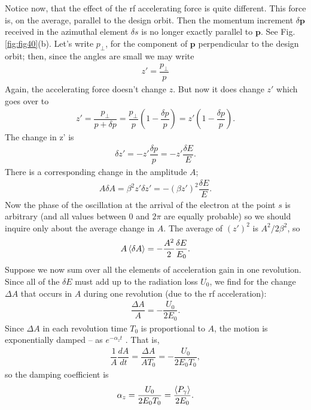 Notice now, that the effect of the rf accelerating force is quite different. This force is, on the average, parallel to the design orbit. Then the momentum increment $\delta\bm{p}$ received in the azimuthal element $\delta s$ is no longer exactly parallel to $\bm{p}$. See Fig. \ref{fig:fig40}(b). Let's write $p_\perp$, for the component of $\bm{p}$ perpendicular to the design orbit; then, since the angles are small we may write
\begin{align}
	z' = \dfrac{p_\perp}{p}
\end{align}
Again, the accelerating force doesn't change $z$. But now it does change $z'$ which goes over to
\begin{align}
	z' = \dfrac{p_\perp}{p + \delta p} = \dfrac{p_\perp}{p} \left( 1 - \dfrac{\delta p}{p} \right) = z' \left( 1 - \dfrac{\delta p}{p} \right).
\end{align}
The change in z’ is
\begin{align}
	\delta z' = -z' \dfrac{\delta p}{p} = -z' \dfrac{\delta E}{E}.
\end{align}
There is a corresponding change in the amplitude $A$;
\begin{align}
	A \delta A = \beta^2 z' \delta z' = -(\beta z')^2 \dfrac{\delta E}{E}.
\end{align}
Now the phase of the oscillation at the arrival of the electron at the point $s$ is arbitrary
 (and all values between $0$ and $2\pi$ are equally probable) so we should inquire only about the average change in $A$. The average of $(z')^2$ is $A^2/2\beta^2$, so
\begin{align}
	A \left< \delta A \right> = - \dfrac{A^2}{2} \dfrac{\delta E}{E_0}.
\end{align}
Suppose we now sum over all the elements of acceleration gain in one revolution. Since all of the $\delta E$ must add up to the radiation loss $U_0$, we find for the change $\Delta A$ that occurs in $A$ during one revolution (due to the rf acceleration):
\begin{align}
	\dfrac{\Delta A}{A} = - \dfrac{U_0}{2 E_0}.
\end{align}
Since $\Delta A$ in each revolution time $T_0$ is proportional to $A$, the motion is exponentially damped -- as $e^{-\alpha_z t}$ . That is,
\begin{align} \label{eq:4.31}
	\dfrac{1}{A} \dfrac{dA}{dt} = \dfrac{\Delta A}{A T_0} = - \dfrac{U_0}{2 E_0 T_0},
\end{align}
so the damping coefficient is
\begin{align}
	\alpha_z = \dfrac{U_0}{2 E_0 T_0} = \dfrac{\left< P_\gamma \right>}{2 E_0}.
\end{align}
